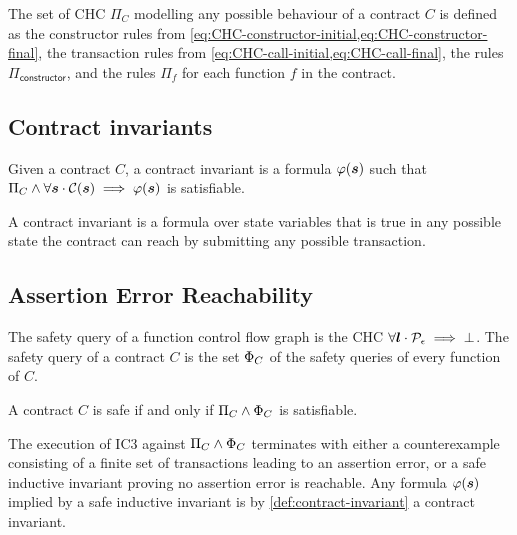 The set of CHC $\Pi_C$ modelling any possible behaviour of
a contract $C$ is defined as the constructor rules from
\cref{eq:CHC-constructor-initial,eq:CHC-constructor-final},
the transaction rules from 
\cref{eq:CHC-call-initial,eq:CHC-call-final}, 
the rules $\Pi_\mathsf{constructor}$, and
the rules $\Pi_f$ for each function $f$ in the contract.

\subsection{Contract invariants}
\begin{definition}
\label{def:contract-invariant}
	Given a contract $C$, a contract invariant is a formula
	$\varphi(\boldsymbol{s})$ such that \mbox{$\Pi_C\wedge\forall\boldsymbol{s}\cdot\mathcal{C}(\boldsymbol{s})\implies\varphi(\boldsymbol{s})$} is satisfiable.
\end{definition}
%
A contract invariant is a formula over state variables
that is true in any possible state the contract can reach
by submitting any possible transaction.

\subsection{Assertion Error Reachability}

\begin{definition}
	The safety query of a function control flow graph
	is the CHC
	\mbox{$\forall\boldsymbol{l}\cdot\mathcal{P}_\epsilon\implies\bot$}.
	The safety query of a contract $C$ is the set $\Phi_C$ of 
	the safety queries of every function of $C$.
\end{definition}



\begin{definition}
	A contract $C$ is safe if and only if
	\mbox{$\Pi_C\wedge\Phi_C$} is satisfiable.
\end{definition}

The execution of IC3 against \mbox{$\Pi_C\wedge\Phi_C$}
terminates with either a counterexample consisting of a
finite set of transactions leading to an assertion error,
or a safe inductive invariant proving no assertion error
is reachable. Any formula $\varphi(\boldsymbol{s})$ implied by a
safe inductive invariant is by \cref{def:contract-invariant}
a contract invariant.







